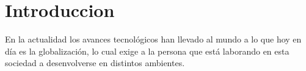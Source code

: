 \documentclass[11pt]{report}
\begin{document}
\section{Introduccion}
En la actualidad los avances tecnol\'ogicos han llevado al mundo a lo que hoy en día es la globalizaci\'on, lo cual exige a la persona que est\'a 
laborando en esta sociedad a desenvolverse en distintos ambientes. 
\end{document}
